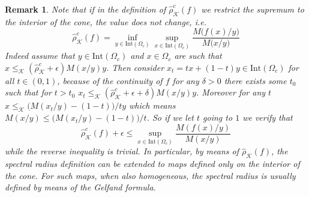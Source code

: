 \documentclass{article}
\newtheorem{remark}[theorem]{Remark}
\newcommand{\cgradius}{\widehat{\rho}_{\cone}}
\newcommand{\cone}{\mathcal{K}}
\newcommand{\interior}{\mathrm{Int}}
\newcommand{\cleq}{\leq_{\cone}}
\begin{document}
\begin{remark}
Note that if in the definition of $\cgradius^c(f)$ we restrict the supremum to the interior of the cone, the value does not change, i.e. 
\begin{equation}
\cgradius^c(f)=\inf_{y\in\interior(\Omega_c)}\sup_{x\in \interior(\Omega_c)}\frac{M\big(f(x)/y\big)}{M\big(x/y\big)}
\end{equation}
Indeed assume that $y\in \interior(\Omega_c)$ and $x\in\Omega_c$ are such that $x\cleq (\cgradius^c+\epsilon)M(x/y)y$. Then consider $x_t=tx+(1-t)y\in \interior(\Omega_c)$ for all $t\in (0,1)$, because of the continuity of $f$ for any $\delta>0$ there exists some $t_0$ such that for $t>t_0$ $x_t\cleq (\cgradius^c+\epsilon+\delta)M(x/y)y$. Moreover for any $t$ $x\cleq \big(M(x_t/y)-(1-t)\big)/t y$ which means $M(x/y)\leq (M(x_t/y)-(1-t)\big)/t$. So if we let $t$ going to $1$ we verify that 
\begin{equation}
    \cgradius^c(f)+\epsilon\leq \sup_{x\in \interior(\Omega_c)}\frac{M(f(x)/y)}{M(x/y)}
\end{equation}
while the reverse inequality is trivial. In particular, by means of $\cgradius(f)$, the spectral radius definition can be extended to maps defined only on the interior of the cone. For such maps, when also homogeneous, the spectral radius is usually defined by means of the Gelfand formula.
\end{remark}
\end{document}
